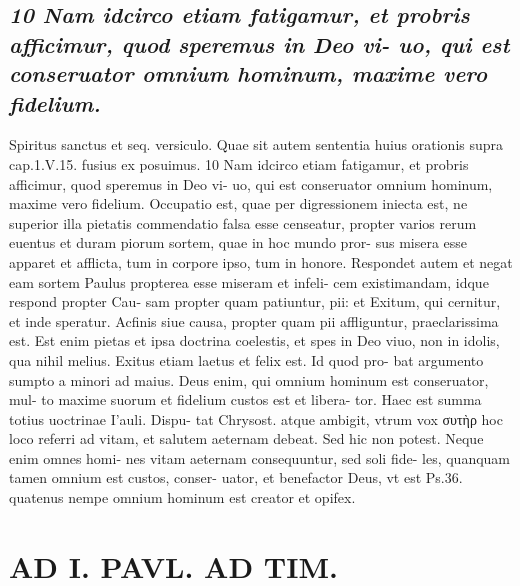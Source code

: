 \documentclass{article}
\begin{document}
\begin{pages}
\subsection*{\textit{10 Nam idcirco etiam fatigamur, et probris afficimur, quod speremus in Deo vi- uo, qui est conseruator omnium hominum, maxime vero fidelium.}}Spiritus sanctus et seq. versiculo. Quae sit autem sententia huius orationis supra cap.1.V.15. fusius ex posuimus. 10 Nam idcirco etiam fatigamur, et probris afficimur, quod speremus in Deo vi- uo, qui est conseruator omnium hominum, maxime vero fidelium. Occupatio est, quae per digressionem iniecta est, ne superior illa pietatis commendatio falsa esse censeatur, propter varios rerum euentus et duram piorum sortem, quae in hoc mundo pror- sus misera esse apparet et afflicta, tum in corpore ipso, tum in honore. Respondet autem et negat eam sortem Paulus propterea esse miseram et infeli- cem existimandam, idque respond propter Cau- sam propter quam patiuntur, pii: et Exitum, qui cernitur, et inde speratur. Acfinis siue causa, propter quam pii affliguntur, praeclarissima est. Est enim pietas et ipsa doctrina coelestis, et spes in Deo viuo, non in idolis, qua nihil melius. Exitus etiam laetus et felix est. Id quod pro- bat argumento sumpto a minori ad maius. Deus enim, qui omnium hominum est conseruator, mul- to maxime suorum et fidelium custos est et libera- tor. Haec est summa totius uoctrinae I'auli. Dispu- tat Chrysost. atque ambigit, vtrum vox συτὴρ hoc loco referri ad vitam, et salutem aeternam debeat. Sed hic non potest. Neque enim omnes homi- nes vitam aeternam consequuntur, sed soli fide- les, quanquam tamen omnium est custos, conser- uator, et benefactor Deus, vt est Ps.36. quatenus nempe omnium hominum est creator et opifex.  \pend
\section*{AD I. PAVL. AD TIM. }
\marginpar{[ p.226 ]}\pstart {}
{}

\end{pages}
\end{document}

